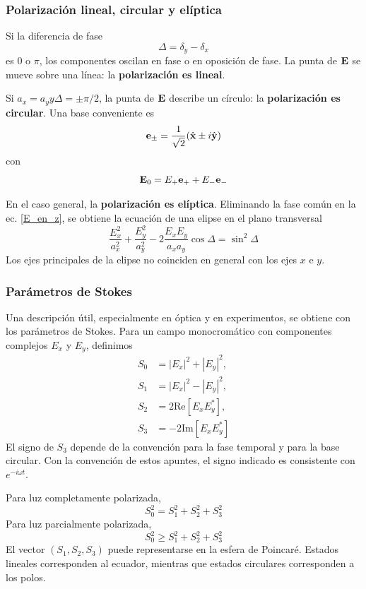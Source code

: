 \documentclass[]{article}
\numberwithin{equation}{section}
\begin{document}
\subsubsection{Polarización lineal, circular y elíptica}
Si la diferencia de fase
\begin{equation}
	\Delta = \delta_y - \delta_x
\end{equation}
es 0 o $\pi$, los componentes oscilan en fase o en oposición de fase. La punta de $\mathbf{E}$ se mueve sobre una línea: la \textbf{polarización es lineal}.

Si $a_x = a_y y \Delta = \pm \pi/2$, la punta de $\mathbf{E}$ describe un círculo: la \textbf{polarización es circular}. Una base conveniente es
\begin{equation}
	\mathbf{e}_\pm = \frac{1}{\sqrt{2}} (\hat{\mathbf{x}}  \pm i \hat{\mathbf{y}})
\end{equation}
con
\begin{equation}
	\mathbf{E}_0 = E_+ \mathbf{e}_+ + E_-\mathbf{e}_-
\end{equation}

En el caso general, la \textbf{polarización es elíptica}. Eliminando la fase común en la ec. \ref{E_en_z}, se obtiene la ecuación de una elipse en el plano transversal
\begin{equation}
	\frac{E_x^2}{a_x^2} + \frac{E_y^2}{a_y^2} - 2 \frac{E_x E_y}{a_x a_y} \cos\Delta = \sin^2 \Delta 
\end{equation}
Los ejes principales de la elipse no coinciden en general con los ejes $x$ e $y$.

\subsubsection{Parámetros de Stokes}
Una descripción útil, especialmente en óptica y en experimentos, se obtiene con los parámetros de Stokes. Para un campo monocromático con componentes complejos $E_x$ y $E_y$, definimos
\begin{align}
	S_0 &= |E_x|^2 + |E_y|^2,\\
	S_1 &= |E_x|^2 - |E_y|^2,\\
	S_2 &= 2 \mathrm{Re}\!\left[E_x E_y^*\right],\\
	S_3 &= -2 \mathrm{Im}\!\left[E_x E_y^*\right]
\end{align}
El signo de $S_3$ depende de la convención para la fase temporal y para la base circular. Con la convención de estos apuntes, el signo indicado es consistente con $e^{- i \omega t}$.

Para luz completamente polarizada,
\begin{equation}
	S_0^2 = S_1^2 + S_2^2 + S_3^2
\end{equation}
Para luz parcialmente polarizada,
\begin{equation}
	S_0^2 \geq S_1^2 + S_2^2 + S_3^2
\end{equation}
El vector $(S_1, S_2, S_3)$ puede representarse en la esfera de Poincaré. Estados lineales corresponden al ecuador, mientras que estados circulares corresponden a los polos.
\end{document}
